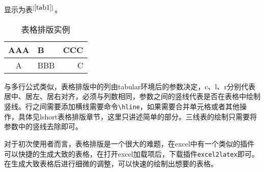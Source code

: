 显示为表$^{[\ref{tab1}]}$。
\begin{table}[h]
\centering
\caption{表格排版实例}
\label{tab1}
\begin{tabular}{|c|l|r|}
\hline
AAA&B&CCC\\
\hline
A&BBB&C\\
\hline
\end{tabular}
\end{table}
与多行公式类似，表格排版中的列由tabular环境后的参数决定，c、l、r分别代表居中、居左、居右对齐，必须与列数相同，参数之间的竖线代表是否在表格中绘制竖线。行之间需要添加横线需要命令\verb|\hline|，如果需要合并单元格或者其他操作，具体见lshort表格排版章节，这里只讲述简单的部分。三线表的绘制只需要将参数中的竖线去除即可。

对于初次使用者而言，表格排版是一个很大的难题，在excel中有一个类似的插件可以快捷的生成大致的表格，在打开excel加载项后，下载插件\verb|excel2latex|即可。在生成大致表格后进行细微的调整，可以快速的绘制出想要的表格。